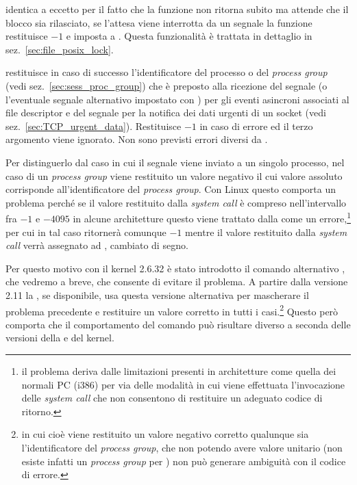 \begin{basedescript}{\desclabelwidth{1.8cm}}
\item[\constd{F\_SETLKW}] identica a  eccetto per il fatto che
  la funzione non ritorna subito ma attende che il blocco sia rilasciato, se
  l'attesa viene interrotta da un segnale la funzione restituisce $-1$ e
  imposta  a .  Questa funzionalità è trattata in
  dettaglio in sez.~\ref{sec:file_posix_lock}.

\item[\constd{F\_GETOWN}] restituisce in caso di successo l'identificatore del
  processo o del \textit{process group} (vedi sez.~\ref{sec:sess_proc_group})
  che è preposto alla ricezione del segnale  (o l'eventuale
  segnale alternativo impostato con ) per gli eventi
  asincroni associati al file descriptor  e del segnale
   per la notifica dei dati urgenti di un socket (vedi
  sez.~\ref{sec:TCP_urgent_data}). Restituisce $-1$ in caso di errore ed il
  terzo argomento viene ignorato. Non sono previsti errori diversi da
  .

  Per distinguerlo dal caso in cui il segnale viene inviato a un singolo
  processo, nel caso di un \textit{process group} viene restituito un valore
  negativo il cui valore assoluto corrisponde all'identificatore del
  \textit{process group}. Con Linux questo comporta un problema perché se il
  valore restituito dalla \textit{system call} è compreso nell'intervallo fra
  $-1$ e $-4095$ in alcune architetture questo viene trattato dalla
   come un errore,\footnote{il problema deriva dalle limitazioni
    presenti in architetture come quella dei normali PC (i386) per via delle
    modalità in cui viene effettuata l'invocazione delle \textit{system call}
    che non consentono di restituire un adeguato codice di ritorno.} per cui
  in tal caso  ritornerà comunque $-1$ mentre il valore restituito
  dalla \textit{system call} verrà assegnato ad , cambiato di
  segno.

  Per questo motivo con il kernel 2.6.32 è stato introdotto il comando
  alternativo , che vedremo a breve, che consente di
  evitare il problema. A partire dalla versione 2.11 la , se
  disponibile, usa questa versione alternativa per mascherare il problema
  precedente e restituire un valore corretto in tutti i casi.\footnote{in cui
    cioè viene restituito un valore negativo corretto qualunque sia
    l'identificatore del \textit{process group}, che non potendo avere valore
    unitario (non esiste infatti un \textit{process group} per ) non
    può generare ambiguità con il codice di errore.} Questo però comporta che
  il comportamento del comando può risultare diverso a seconda delle versioni
  della  e del kernel.


\end{basedescript}
